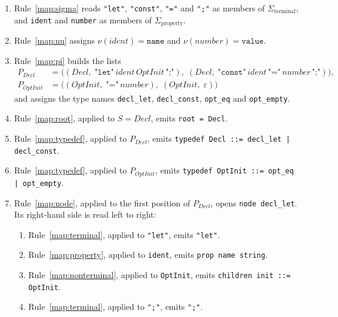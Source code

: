 \documentclass[]{report}
\begin{document}
\begin{enumerate}
  \item Rule~\ref{map:sigma} reads \texttt{"let"}, \texttt{"const"}, \texttt{"="} and \texttt{";"} as members of $\Sigma_{\mathrm{terminal}}$, and \texttt{ident} and \texttt{number} as members of $\Sigma_{\mathrm{property}}$.
  \item Rule~\ref{map:nu} assigns $\nu(\mathit{ident}) = \texttt{name}$ and $\nu(\mathit{number}) = \texttt{value}$.
  \item Rule~\ref{map:pi} builds the lists
    \begin{align*}
      P_{\mathit{Decl}} &= \bigl(
        (\mathit{Decl},\; \texttt{"let"}\,\mathit{ident}\,\mathit{OptInit}\,\texttt{";"}),\;
        (\mathit{Decl},\; \texttt{"const"}\,\mathit{ident}\,\texttt{"="}\,\mathit{number}\,\texttt{";"})
      \bigr), \\
      P_{\mathit{OptInit}} &= \bigl(
        (\mathit{OptInit},\; \texttt{"="}\,\mathit{number}),\;
        (\mathit{OptInit},\; \varepsilon)
      \bigr)
    \end{align*}
    and assigns the type names \texttt{decl\_let}, \texttt{decl\_const}, \texttt{opt\_eq} and \texttt{opt\_empty}.
  \item Rule~\ref{map:root}, applied to $S = \mathit{Decl}$, emits \texttt{root = Decl}.
  \item Rule~\ref{map:typedef}, applied to $P_{\mathit{Decl}}$, emits \texttt{typedef Decl ::= decl_let | decl_const}.
  \item Rule~\ref{map:typedef}, applied to $P_{\mathit{OptInit}}$, emits \texttt{typedef OptInit ::= opt_eq | opt_empty}.
  \item Rule~\ref{map:node}, applied to the first position of $P_{\mathit{Decl}}$, opens \texttt{node decl_let}. Its right-hand side is read left to right:
    \begin{enumerate}
      \item Rule~\ref{map:terminal}, applied to \texttt{"let"}, emits \texttt{"let"}.
      \item Rule~\ref{map:property}, applied to \texttt{ident}, emits \texttt{prop name string}.
      \item Rule~\ref{map:nonterminal}, applied to \texttt{OptInit}, emits \texttt{children init ::= OptInit}.
      \item Rule~\ref{map:terminal}, applied to \texttt{";"}, emits \texttt{";"}.
    \end{enumerate}

\end{enumerate}
\end{document}
